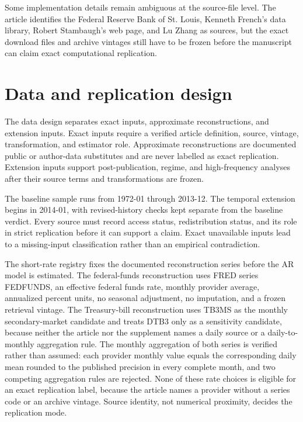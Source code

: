 \documentclass[11pt]{article}
\begin{document}
Some implementation details remain ambiguous at the source-file level. The
article identifies the Federal Reserve Bank of St. Louis, Kenneth French's data
library, Robert Stambaugh's web page, and Lu Zhang as sources, but the exact
download files and archive vintages still have to be frozen before the manuscript
can claim exact computational replication.

\section{Data and replication design}
\label{sec:data}

The data design separates exact inputs, approximate reconstructions, and
extension inputs. Exact inputs require a verified article definition, source,
vintage, transformation, and estimator role. Approximate reconstructions are
documented public or author-data substitutes and are never labelled as exact
replication. Extension inputs support post-publication, regime, and
high-frequency analyses after their source terms and transformations are frozen.

The baseline sample runs from 1972-01 through 2013-12. %
The temporal extension begins in 2014-01, with revised-history checks kept separate from the baseline verdict. %
Every source must record access status, redistribution status, and its role in
strict replication before it can support a claim. Exact unavailable inputs lead
to a missing-input classification rather than an empirical contradiction.

The short-rate registry fixes the documented reconstruction series before the AR
model is estimated. The federal-funds reconstruction uses FRED series FEDFUNDS,
an effective federal funds rate, monthly provider average, annualized percent
units, no seasonal adjustment, no imputation, and a frozen retrieval vintage. %
The Treasury-bill reconstruction uses TB3MS as the monthly secondary-market
candidate and treats DTB3 only as a sensitivity candidate, because neither the
article nor the supplement names a daily source or a daily-to-monthly
aggregation rule. The monthly aggregation of both series is verified rather than
assumed: each provider monthly value equals the corresponding daily mean rounded
to the published precision in every complete month, and two competing %
aggregation rules are rejected. None of these rate choices is %
eligible for an exact replication label, because the article names a provider
without a series code or an archive vintage. Source identity, not numerical
proximity, decides the replication mode. %
\end{document}
